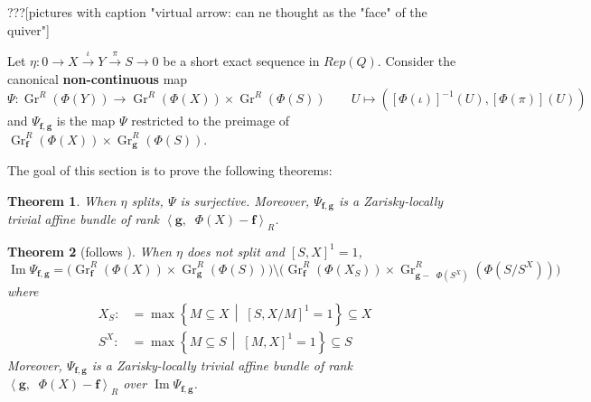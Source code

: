 \documentclass[reqno,11pt]{amsart}
\numberwithin{equation}{section}
\theoremstyle{plain}
\newtheorem{theorem}{Theorem}[section]
\theoremstyle{plain}
\numberwithin{equation}{section}
\theoremstyle{remark}
\DeclareMathOperator{\Img}{\operatorname{Im}}
\DeclareMathOperator{\dimv}{\operatorname{\underline{\mathbf{dim}}}}
\newcommand{\Grr}{\operatorname{Gr}^{R}}
\newcommand{\dimvec}[1]{\mathbf{#1}}
\begin{document}
???[pictures with caption "virtual arrow: can ne thought as the "face" of the quiver"]

Let $\eta: 0\longrightarrow X \stackrel{\iota}{\longrightarrow} Y \stackrel{\pi}{\longrightarrow} S \longrightarrow 0$ be a short exact sequence in $Rep(Q)$. Consider the canonical \textbf{non-continuous} map
$$\Psi: \Grr(\Phi(Y)) \longrightarrow \Grr(\Phi(X)) \times \Grr(\Phi(S)) \qquad U \longmapsto \left([\Phi(\iota)]^{-1}(U),[\Phi(\pi)](U)   \right)$$
and  $\Psi_{\dimvec{f},\dimvec{g}}$ is the map $\Psi$ restricted to the preimage of $\Grr_{\dimvec{f}}(\Phi(X)) \times \Grr_{\dimvec{g}}(\Phi(S))$.

The goal of this section is to prove the following theorems:
\begin{theorem}
	When $\eta$ splits, $\Psi$ is surjective. Moreover, $\Psi_{\dimvec{f},\dimvec{g}}$ is a Zarisky-locally trivial affine bundle of rank $\left< \dimvec{g},\dimv \Phi(X) - \dimvec{f}\right>_R$.
\end{theorem}
\begin{theorem}[follows {\cite[Theorem 32]{irelli2019cell}}]
	When $\eta$ does not split and $[S,X]^1=1$, 
	$$\Img \Psi_{\dimvec{f},\dimvec{g}} = \bigg(\Grr_{\dimvec{f}}(\Phi(X)) \times \Grr_{\dimvec{g}}(\Phi(S)) \bigg) \setminus \bigg(\Grr_{\dimvec{f}}(\Phi(X_S)) \times \Grr_{\dimvec{g}-\dimv \Phi(S^X)}\left(\Phi(S/S^X)\right) \bigg)$$
	where 
	\begin{equation*}
	\begin{aligned}
	X_S:&= \max \left\{ M \subseteq X \,\middle|\; [S,X/M ]^1=1 \right\} \subseteq X\\
	S^X:&= \max \left\{ M \subseteq S \,\middle|\; [M,X]^1=1 \right\} \subseteq S
	\end{aligned}
	\end{equation*}
Moreover, $\Psi_{\dimvec{f},\dimvec{g}}$ is a Zarisky-locally trivial affine bundle of rank $\left< \dimvec{g},\dimv \Phi(X) - \dimvec{f}\right>_R$ over $\Img \Psi_{\dimvec{f},\dimvec{g}}$.
\end{theorem}
\end{document}
